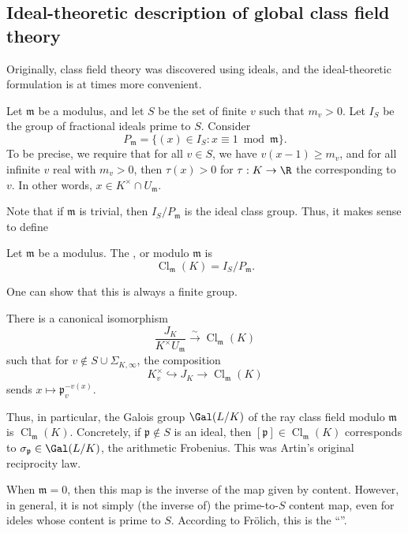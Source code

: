 \documentclass[a4paper]{article}
\DeclareMathOperator\Cl{\mathrm{Cl}}
\begin{document}
\subsection{Ideal-theoretic description of global class field theory}
Originally, class field theory was discovered using ideals, and the ideal-theoretic formulation is at times more convenient.

Let $\mathfrak{m}$ be a modulus, and let $S$ be the set of finite $v$ such that $m_v > 0$. Let $I_S$ be the group of fractional ideals prime to $S$. Consider
\[
  P_\mathfrak{m} = \{(x) \in I_S: x \equiv 1 \bmod {\mathfrak{m}}\}.
\]
To be precise, we require that for all $v \in S$, we have $v(x - 1) \geq m_v$, and for all infinite $v$ real with $m_v > 0$, then $\tau(x) > 0$ for $\tau: K \to \R$ the corresponding to $v$. In other words, $x \in K^\times \cap U_\mathfrak{m}$.

Note that if $\mathfrak{m}$ is trivial, then $I_S/P_\mathfrak{m}$ is the ideal class group. Thus, it makes sense to define
\begin{defi}
  Let $\mathfrak{m}$ be a modulus. The , or  modulo $\mathfrak{m}$ is
  \[
    \Cl_\mathfrak{m}(K) = I_S/P_\mathfrak{m}.
  \]
\end{defi}
One can show that this is always a finite group.

\begin{prop}
  There is a canonical isomorphism
  \[
    \frac{J_K}{K^\times U_\mathfrak{m}} \overset{\sim}{\to} \Cl_\mathfrak{m}(K)
  \]
  such that for $v \not \in S\cup \Sigma_{K, \infty}$, the composition
  \[
    K_v^\times \hookrightarrow J_K \to \Cl_\mathfrak{m}(K)
  \]
  sends $x \mapsto \mathfrak{p}_v^{-v(x)}$.

  Thus, in particular, the Galois group $\Gal(L/K)$ of the ray class field modulo $\mathfrak{m}$ is $\Cl_\mathfrak{m}(K)$. Concretely, if $\mathfrak{p} \not \in S$ is an ideal, then $[\mathfrak{p}] \in \Cl_{\mathfrak{m}}(K)$ corresponds to $\sigma_\mathfrak{p} \in \Gal (L/K)$, the arithmetic Frobenius. This was Artin's original reciprocity law.
\end{prop}

When $\mathfrak{m} = 0$, then this map is the inverse of the map given by content. However, in general, it is not simply (the inverse of) the prime-to-$S$ content map, even for ideles whose content is prime to $S$. According to Fr\"olich, this is the ``''.
\end{document}

